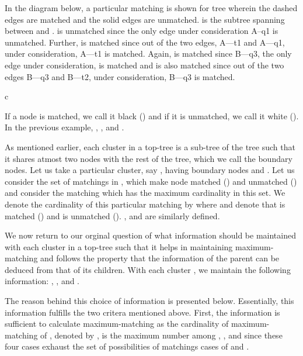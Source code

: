 \documentclass[a4paper,12pt]{article}
\begin{document}
In the diagram below, a particular matching  is shown for tree  wherein the dashed edges are matched and the solid edges are unmatched.  is the subtree spanning between  and .  is unmatched since the only edge under consideration A--q1 is unmatched. Further,  is matched since out of the two edges, A---t1 and A---q1, under consideration, A---t1 is matched. Again,  is matched since B---q3, the only edge under consideration, is matched and  is also matched since out of the two edges B---q3 and B---t2, under consideration, B---q3 is matched.
\begin{tabular}{c}
\end{tabular}


If a node is matched, we call it black () and if it is unmatched, we call it white (). In the previous example, , ,  and .


As mentioned earlier, each cluster in a top-tree is a sub-tree of the tree  such that it shares atmost two nodes with the rest of the tree, which we call the boundary nodes. Let us take a particular cluster, say , having boundary nodes  and . Let us consider the set of matchings in , which make node  matched () and  unmatched () and consider the matching  which has the maximum cardinality in this set. We denote the cardinality of this particular matching  by  where  and  denote that  is matched () and  is unmatched (). ,  and  are similarly defined.

We now return to our orginal question of what information should be maintained with each cluster in a top-tree such that it helps in maintaining maximum-matching and follows the property that the information of the parent can be deduced from that of its children. With each cluster , we maintain the following information: , ,  and . 

The reason behind this choice of information is presented below.  Essentially, this information fulfills the two critera mentioned above. First, the information is sufficient to calculate maximum-matching as the cardinality of maximum-matching of , denoted by , is the maximum number among , ,  and  since these four cases exhaust the set of possibilities of matchings cases of  and .
\end{document}
